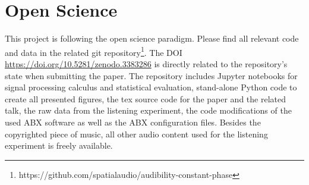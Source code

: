 \section*{Open Science}
This project is following the open science paradigm.
%
Please find all relevant code and data in the related git repository\footnote{
https://github.com/spatialaudio/audibility-constant-phase}.
%
The DOI \url{https://doi.org/10.5281/zenodo.3383286} is directly related to the repository's state
when submitting the paper.
%
The repository includes Jupyter notebooks for signal processing calculus and
statistical evaluation, stand-alone Python code to create all presented figures,
the tex source code for the paper and the related talk, the
raw data from the listening experiment, the code modifications of the used ABX
software as well as the ABX configuration files.
%
Besides the copyrighted piece of music, all other audio content used for the
listening experiment is freely available.
